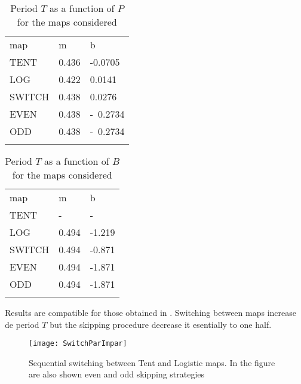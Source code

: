 \begin{table}
\caption{Period $T$ as a function of $P$ for the maps considered}
\label{tabla:tab1}       %
\begin{tabular}{lll}
\hline\noalign{\smallskip}
map & m & b  \\
\noalign{\smallskip}\hline\noalign{\smallskip}
TENT&0.436 & -0.0705 \\
LOG &0.422 & 0.0141 \\
SWITCH &0.438 & 0.0276 \\
EVEN &0.438 & -~0.2734 \\
ODD &0.438 & -~0.2734 \\
\noalign{\smallskip}\hline
\end{tabular}
\end{table}
%
\begin{table}
\caption{Period $T$ as a function of $B$ for the maps considered}
\label{tabla:tab2}       %
\begin{tabular}{lll}
\hline\noalign{\smallskip}
map & m & b  \\
\noalign{\smallskip}\hline\noalign{\smallskip}
TENT&- & - \\
LOG &0.494 & -1.219 \\
SWITCH &0.494 & -0.871 \\
EVEN &0.494 & -1.871 \\
ODD &0.494 & -1.871 \\
\noalign{\smallskip}\hline
\end{tabular}
\end{table}
Results are compatible for those obtained in \cite{Nagaraj2008}. Switching between maps increase de period $T$ but the skipping procedure decrease it esentially to one half. 
% 

\begin{figure}
	\texttt{[image: SwitchParImpar]}
	\caption{Sequential switching between Tent and Logistic maps. In the figure are also shown even and odd skipping strategies} \label{fig:seq}
\end{figure}

